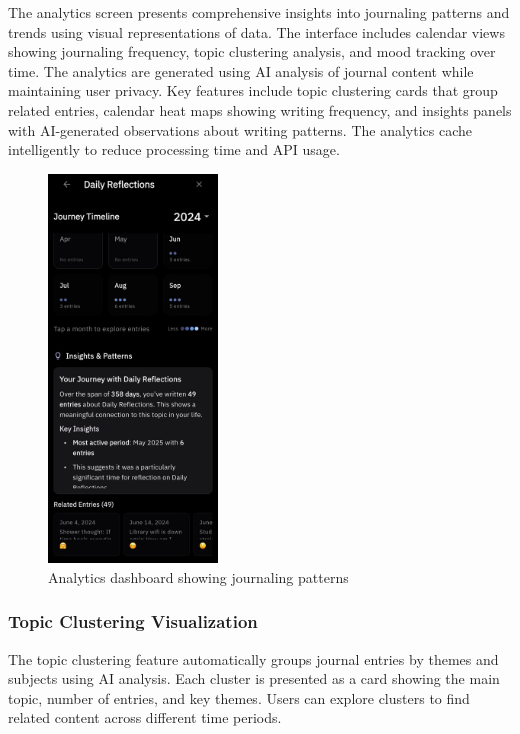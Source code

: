 The analytics screen presents comprehensive insights into journaling patterns and trends using visual representations of data. The interface includes calendar views showing journaling frequency, topic clustering analysis, and mood tracking over time. The analytics are generated using AI analysis of journal content while maintaining user privacy. Key features include topic clustering cards that group related entries, calendar heat maps showing writing frequency, and insights panels with AI-generated observations about writing patterns. The analytics cache intelligently to reduce processing time and API usage.

\begin{figure}[H]
\centering
\includegraphics[width=0.4\textwidth]{files/imgs/prototype/analytics_screen.jpeg}
\caption{Analytics dashboard showing journaling patterns}
\label{fig:analytics-screen}
\end{figure}

\subsubsection{Topic Clustering Visualization}

The topic clustering feature automatically groups journal entries by themes and subjects using AI analysis. Each cluster is presented as a card showing the main topic, number of entries, and key themes. Users can explore clusters to find related content across different time periods.

